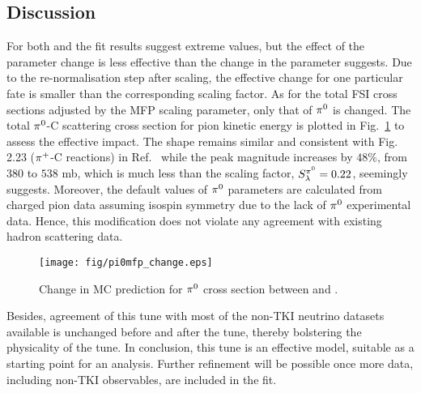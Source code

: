     \subsection{Discussion}
    For both \gC and \gT the fit results suggest extreme values, but the effect of the parameter change is less effective than the change in the parameter suggests. 
    Due to the re-normalisation step after scaling, the effective change for one particular fate is smaller than the corresponding scaling factor. 
    As for the total FSI cross sections adjusted by the MFP scaling parameter, only that of $\pi^0$ is changed. 
    The total $\pi^0$-C scattering cross section for pion kinetic energy is plotted in Fig.~\ref{fig:pizmfp_change} to assess the effective impact. 
    The shape remains similar and consistent with Fig. 2.23 ($\pi^+$-C reactions) in Ref.~\cite{Andreopoulos:2015wxa} while the peak magnitude increases by $48\%$, from $380$ to $538$ mb, which is much less than the scaling factor, $S_\lambda^{\pi^{0}}=0.22$, seemingly suggests. 
    Moreover, the default values of $\pi^0$ parameters are calculated from charged pion data assuming isospin symmetry due to the lack of $\pi^0$ experimental data. 
    Hence, this modification does not violate any  agreement with existing hadron scattering data.
    \begin{figure}[!htb] 	
        \centering 		
        \texttt{[image: fig/pi0mfp\_change.eps]}
        \caption{\label{fig:pizmfp_change} Change in MC prediction for $\pi^0$ cross section between \gZero and \gC . } 
    \end{figure}
    
    Besides, agreement of this tune with most of the non-TKI neutrino datasets available is unchanged before and after the tune,  thereby bolstering the physicality of the tune. 
    In conclusion, this tune is an effective model, suitable as a starting point for an analysis. 
    Further refinement will be possible once more data, including non-TKI observables, are included in the fit. 

